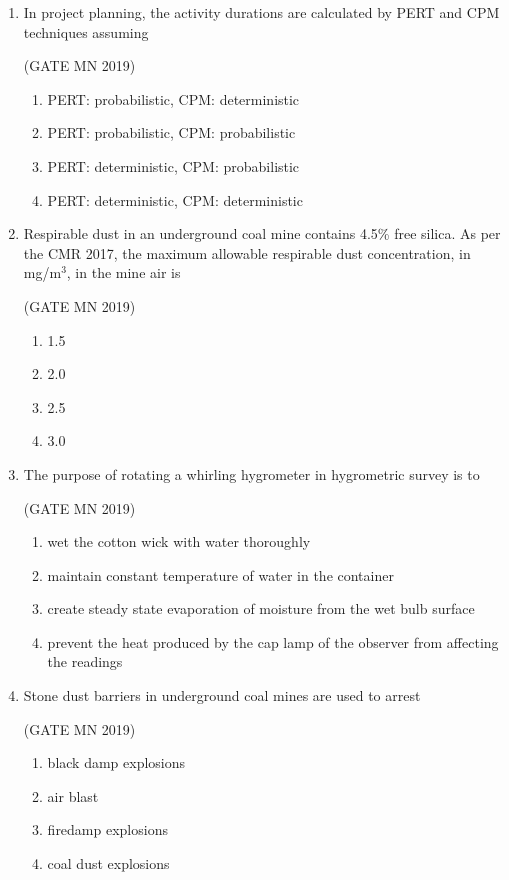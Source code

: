 \documentclass[journal]{IEEEtran}
\begin{document}
\begin{enumerate}
\item In project planning, the activity durations are calculated by PERT and CPM techniques assuming


	\hfill(GATE MN 2019)
\begin{enumerate}
\item PERT: probabilistic, CPM: deterministic
\item PERT: probabilistic, CPM: probabilistic
\item PERT: deterministic, CPM: probabilistic
\item PERT: deterministic, CPM: deterministic
\end{enumerate}


\item Respirable dust in an underground coal mine contains 4.5\% free silica. As per the CMR 2017, the maximum allowable respirable dust concentration, in mg/m$^3$, in the mine air is

	\hfill(GATE MN 2019)
\begin{multicols}{4}
\begin{enumerate}
\item 1.5
\item 2.0
\item 2.5
\item 3.0
\end{enumerate}
\end{multicols}


\item The purpose of rotating a whirling hygrometer in hygrometric survey is to


	\hfill(GATE MN 2019)
\begin{enumerate}
\item wet the cotton wick with water thoroughly
\item maintain constant temperature of water in the container
\item create steady state evaporation of moisture from the wet bulb surface
\item prevent the heat produced by the cap lamp of the observer from affecting the readings
\end{enumerate}



\item Stone dust barriers in underground coal mines are used to arrest


	\hfill(GATE MN 2019)
\begin{enumerate}
\item black damp explosions
\item air blast
\item firedamp explosions
\item coal dust explosions
\end{enumerate}




\end{enumerate}
\end{document}
